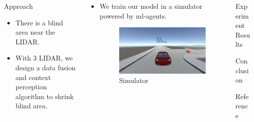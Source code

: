 \documentclass[final,dvipsnames]{beamer}
\begin{document}
\begin{frame}[t, fragile = singleslide]{}
\begin{columns}[t]
\begin{column}{0.3\textwidth}
\begin{block}{Approach}
  \begin{subblock}
  \begin{itemize}
    \item There is a blind area near the LIDAR.
    \item With 3 LIDAR, we design a data fusion and context perception algorithm to shrink blind area.
  \end{itemize}
  \end{subblock}

\end{block}
\end{column}

\begin{column}{0.3\textwidth}
\begin{subblock}[RL Algorithm]
  \begin{itemize}
    \item We train our model in a simulator powered by ml-agents.
    \begin{figure}[ht]
    \centering
    \includegraphics[width = 0.9\columnwidth]{./assets/simulator.jpeg}
    \caption{Simulator}
    \label{fig:label}
  \end{figure}
  \end{itemize}
\end{subblock}

\begin{subblock}
  
\end{subblock}
\end{column}

\begin{column}{0.3\textwidth}

\begin{block}{Experiment Results}

\end{block}

\begin{block}{Conclusion}

\end{block}

\begin{block}{Reference}

\end{block}
\end{column}

\end{columns}
\end{frame}
\end{document}

